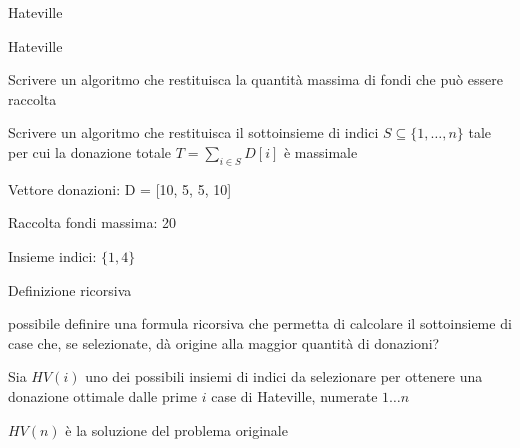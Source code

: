 \begin{frame}{Hateville}

\vspace{-9pt}

\end{frame}

\begin{frame}{Hateville}

\vspace{-9pt}
\begin{myboxtitle}[Problemi]
\BIL
\item Scrivere un algoritmo che restituisca la quantità massima di
fondi che può essere raccolta
\item Scrivere un algoritmo che restituisca il sottoinsieme di indici 
$S \subseteq \{ 1, \ldots, n \}$ tale per cui la donazione totale
$T = \sum_{i \in S} D[i]$ è massimale
\EIL
\end{myboxtitle}

\begin{myboxtitle}
\BIL
\item Vettore donazioni: \textsf{D = [10, 5, 5, 10]}
\item Raccolta fondi massima: 20
\item Insieme indici: $\{1, 4\}$
\EIL
\end{myboxtitle}
\end{frame}


\begin{frame}{Definizione ricorsiva}

\vspace{-9pt}
\begin{myboxtitle}
\EE possibile definire una formula ricorsiva che permetta di calcolare
il sottoinsieme di case che, se selezionate, dà origine alla maggior quantità di donazioni?
\end{myboxtitle}

\bigskip
{}
\BIL
\item Sia $HV(i)$ uno dei possibili insiemi di indici da selezionare per ottenere una donazione ottimale dalle prime $i$ case di Hateville, numerate $1 \ldots n$ 
\item $HV(n)$ è la soluzione del problema originale
\EIL

\end{frame}


